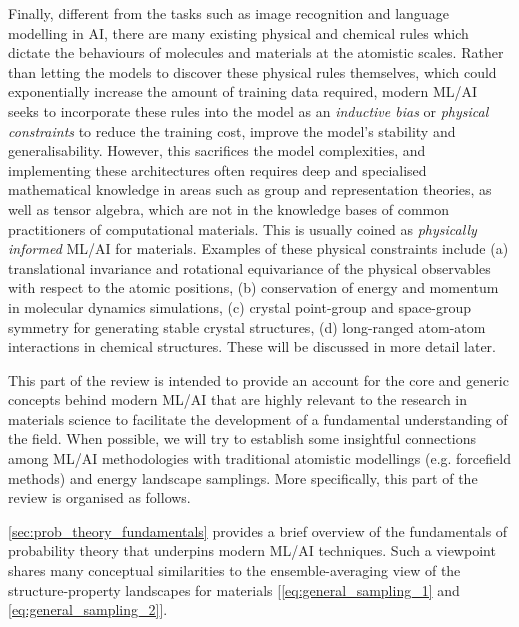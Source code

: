 Finally, different from the tasks such as image recognition and language modelling in AI, there are many existing physical and chemical rules which dictate the behaviours of molecules and materials at the atomistic scales. Rather than letting the models to discover these physical rules themselves, which could exponentially increase the amount of training data required, modern ML/AI seeks to incorporate these rules into the model as an \emph{inductive bias} or \emph{physical constraints} to reduce the training cost, improve the model's stability and generalisability. However, this sacrifices the model complexities, and implementing these architectures often requires deep and specialised mathematical knowledge in areas such as group and representation theories, as well as tensor algebra, which are not in the knowledge bases of common practitioners of computational materials.  This is usually coined as \emph{physically informed} ML/AI for materials. Examples of these physical constraints include (a) translational invariance and rotational equivariance of the physical observables with respect to the atomic positions,\cite{Bartok2013_RepresentingChemEnv,grisafi2018symmetry,duval2023hitchhiker} (b) conservation of energy and momentum in molecular dynamics simulations,\cite{chmiela2017machine} (c) crystal point-group and space-group symmetry for generating stable crystal structures,\cite{jiao2024space,zhu2024wycryst} (d) long-ranged atom-atom interactions in chemical structures.\cite{grisafi2019incorporating,frank2022so3krates} These will be discussed in more detail later. 

This part of the review is intended to provide an account for the core and generic concepts behind modern ML/AI that are highly relevant to the research in materials science to facilitate the development of a fundamental understanding of the field. 
When possible, we will try to establish some insightful connections among ML/AI methodologies with traditional atomistic modellings (e.g. forcefield methods) and energy landscape samplings. More specifically, this part of the review is organised as follows. 

\cref{sec:prob_theory_fundamentals} provides a brief overview of the fundamentals of probability theory that underpins modern ML/AI techniques.\cite{murphy2012machine,goodfellow2016deep} Such a viewpoint shares many conceptual similarities to the ensemble-averaging view of the structure-property landscapes for materials [\cref{eq:general_sampling_1} and \cref{eq:general_sampling_2}]. 

